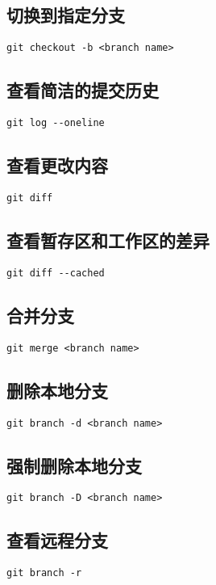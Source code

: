\documentclass[a4paper, 12pt]{article}
\begin{document}
\subsection{切换到指定分支}
\begin{lstlisting}
git checkout -b <branch name>
\end{lstlisting}

\subsection{查看简洁的提交历史}
\begin{lstlisting}
git log --oneline
\end{lstlisting}

\subsection{查看更改内容}
\begin{lstlisting}
git diff
\end{lstlisting}

\subsection{查看暂存区和工作区的差异}
\begin{lstlisting}
git diff --cached
\end{lstlisting}

\subsection{合并分支}
\begin{lstlisting}
git merge <branch name>
\end{lstlisting}

\subsection{删除本地分支}
\begin{lstlisting}
git branch -d <branch name>
\end{lstlisting}

\subsection{强制删除本地分支}
\begin{lstlisting}
git branch -D <branch name>
\end{lstlisting}

\subsection{查看远程分支}
\begin{lstlisting}
git branch -r
\end{lstlisting}
\end{document}
